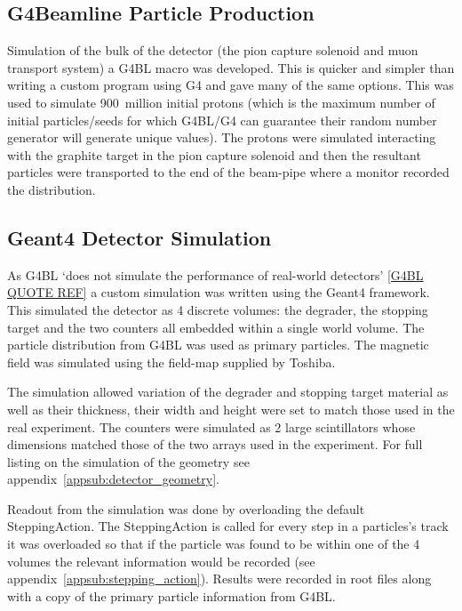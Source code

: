 \documentclass[]{article}
\begin{document}
\subsection{G4Beamline Particle Production} %
\label{sub:g4bl_particle_production}
Simulation of the bulk of the detector (the pion capture solenoid and muon transport system) a G4BL macro was developed. This is quicker and simpler than writing a custom program using G4 and gave many of the same options. This was used to simulate 900~million initial protons (which is the maximum number of initial particles/seeds for which G4BL/G4 can guarantee their random number generator will generate unique values). The protons were simulated interacting with the graphite target in the pion capture solenoid and then the resultant particles were transported to the end of the beam-pipe where a monitor recorded the distribution.

\subsection{Geant4 Detector Simulation} %
\label{sub:geant4_detector_simulation}
As G4BL `does not simulate the performance of real-world detectors' \ref{G4BL QUOTE REF} a custom simulation was written using the Geant4 framework. This simulated the detector as 4 discrete volumes: the degrader, the stopping target and the two counters all embedded within a single world volume. The particle distribution from G4BL was used as primary particles. The magnetic field was simulated using the field-map supplied by Toshiba.

The simulation allowed variation of the degrader and stopping target material as well as their thickness, their width and height were set to match those used in the real experiment. The counters were simulated as 2 large scintillators whose dimensions matched those of the two arrays used in the experiment. For full listing on the simulation of the geometry see appendix~\ref{appsub:detector_geometry}.

Readout from the simulation was done by overloading the default SteppingAction. The SteppingAction is called for every step in a particles's track it was overloaded so that if the particle was found to be within one of the 4 volumes the relevant information would be recorded (see appendix~\ref{appsub:stepping_action}). Results were recorded in root files along with a copy of the primary particle information from G4BL. 
\end{document}
